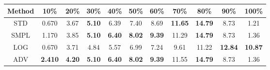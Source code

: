 \documentclass{standalone}
\begin{document}
\begin{tabular}{c|cccccccccc}
      \toprule
      Method & 10\% & 20\% & 30\% & 40\% & 50\% & 60\% & 70\% & 80\% & 90\% & 100\% \\
      \midrule
STD & 0.670 & 3.67 & \textbf{5.10} & 6.39 & 7.40 & 8.69 & \textbf{11.65} & \textbf{14.79} & 8.73 & 1.21\\
SMPL & 1.170 & 3.85 & \textbf{5.10} & \textbf{6.40} & \textbf{8.02} & \textbf{9.39} & 11.29 & \textbf{14.79} & 8.73 & 1.36\\
LOG & 0.670 & 3.71 & 4.84 & 5.57 & 6.99 & 7.24 & 9.61 & 11.22 & \textbf{12.84} & \textbf{10.87}\\
ADV & \textbf{2.410} & \textbf{4.20} & \textbf{5.10} & \textbf{6.40} & \textbf{8.02} & \textbf{9.39} & 11.55 & \textbf{14.79} & 8.73 & 1.36\\
  \bottomrule
\end{tabular}
\end{document}
